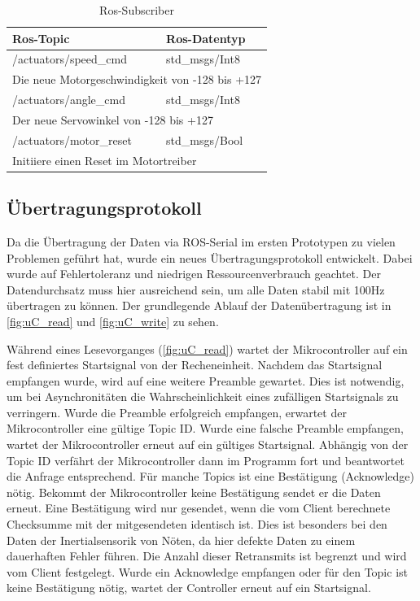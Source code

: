 \begin{table}[H]
  \centering
  \begin{tabularx}{\textwidth}{|l|l|}
    \hline
     Ros-Topic 			& Ros-Datentyp			 	\\ \hline\hline
    /actuators/speed\_cmd		& std\_msgs/Int8										\\ \hline	
      \multicolumn{2}{|X|}{Die neue Motorgeschwindigkeit von -128 bis +127}		\\ \hline\hline
    /actuators/angle\_cmd		& std\_msgs/Int8										\\ \hline	
     \multicolumn{2}{|X|}{Der neue Servowinkel von -128 bis +127}			\\ \hline\hline
    /actuators/motor\_reset		& std\_msgs/Bool										\\ \hline	
     \multicolumn{2}{|X|}{Initiiere einen Reset im Motortreiber}			\\ \hline
  \end{tabularx}
  \caption{Ros-Subscriber}%
  \label{tab:ros-sub}
\end{table}



\subsection{Übertragungsprotokoll}
Da die Übertragung der Daten via ROS-Serial im ersten Prototypen zu vielen Problemen geführt hat, wurde ein neues Übertragungsprotokoll entwickelt.
Dabei wurde auf Fehlertoleranz und niedrigen Ressourcenverbrauch geachtet. Der Datendurchsatz muss hier ausreichend sein, um alle Daten stabil mit 100Hz
übertragen zu können.
Der grundlegende Ablauf der Datenübertragung ist in \cref{fig:uC_read} und \ref{fig:uC_write} zu sehen.

Während eines Lesevorganges (\cref{fig:uC_read}) wartet der Mikrocontroller auf ein fest definiertes Startsignal von der Recheneinheit. Nachdem das Startsignal empfangen wurde, wird auf eine weitere Preamble gewartet.
Dies ist notwendig, um bei Asynchronitäten die Wahrscheinlichkeit eines zufälligen Startsignals zu verringern. Wurde die Preamble erfolgreich empfangen, erwartet der Mikrocontroller eine gültige Topic ID.
Wurde eine falsche Preamble empfangen, wartet der Mikrocontroller erneut auf ein gültiges Startsignal. Abhängig von der Topic ID verfährt der Mikrocontroller dann im Programm fort und beantwortet
die Anfrage entsprechend. Für manche Topics ist eine Bestätigung (Acknowledge) nötig. Bekommt der Mikrocontroller keine Bestätigung sendet er die Daten erneut. Eine Bestätigung wird nur gesendet,
wenn die vom Client berechnete Checksumme mit der mitgesendeten identisch ist. Dies ist besonders bei den Daten der Inertialsensorik von Nöten, da hier defekte Daten zu einem dauerhaften Fehler führen. 
Die Anzahl dieser Retransmits ist begrenzt und wird vom Client festgelegt. Wurde ein Acknowledge empfangen oder für den Topic ist keine Bestätigung
nötig, wartet der Controller erneut auf ein Startsignal.

